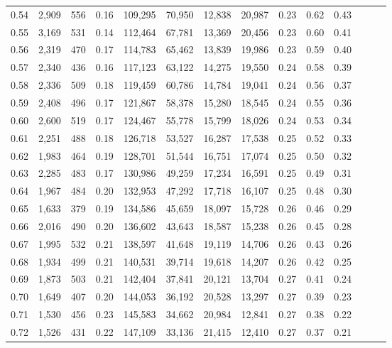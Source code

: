 \begin{tabular}{rrrrrrrrrrrrrr}
0.54 &  2,909 &    556 &  0.16 &  109,295 &   70,950 &  12,838 &  20,987 &  0.23 &  0.62 &      0.43 \\
0.55 &  3,169 &    531 &  0.14 &  112,464 &   67,781 &  13,369 &  20,456 &  0.23 &  0.60 &      0.41 \\
0.56 &  2,319 &    470 &  0.17 &  114,783 &   65,462 &  13,839 &  19,986 &  0.23 &  0.59 &      0.40 \\
0.57 &  2,340 &    436 &  0.16 &  117,123 &   63,122 &  14,275 &  19,550 &  0.24 &  0.58 &      0.39 \\
0.58 &  2,336 &    509 &  0.18 &  119,459 &   60,786 &  14,784 &  19,041 &  0.24 &  0.56 &      0.37 \\
0.59 &  2,408 &    496 &  0.17 &  121,867 &   58,378 &  15,280 &  18,545 &  0.24 &  0.55 &      0.36 \\
0.60 &  2,600 &    519 &  0.17 &  124,467 &   55,778 &  15,799 &  18,026 &  0.24 &  0.53 &      0.34 \\
0.61 &  2,251 &    488 &  0.18 &  126,718 &   53,527 &  16,287 &  17,538 &  0.25 &  0.52 &      0.33 \\
0.62 &  1,983 &    464 &  0.19 &  128,701 &   51,544 &  16,751 &  17,074 &  0.25 &  0.50 &      0.32 \\
0.63 &  2,285 &    483 &  0.17 &  130,986 &   49,259 &  17,234 &  16,591 &  0.25 &  0.49 &      0.31 \\
0.64 &  1,967 &    484 &  0.20 &  132,953 &   47,292 &  17,718 &  16,107 &  0.25 &  0.48 &      0.30 \\
0.65 &  1,633 &    379 &  0.19 &  134,586 &   45,659 &  18,097 &  15,728 &  0.26 &  0.46 &      0.29 \\
0.66 &  2,016 &    490 &  0.20 &  136,602 &   43,643 &  18,587 &  15,238 &  0.26 &  0.45 &      0.28 \\
0.67 &  1,995 &    532 &  0.21 &  138,597 &   41,648 &  19,119 &  14,706 &  0.26 &  0.43 &      0.26 \\
0.68 &  1,934 &    499 &  0.21 &  140,531 &   39,714 &  19,618 &  14,207 &  0.26 &  0.42 &      0.25 \\
0.69 &  1,873 &    503 &  0.21 &  142,404 &   37,841 &  20,121 &  13,704 &  0.27 &  0.41 &      0.24 \\
0.70 &  1,649 &    407 &  0.20 &  144,053 &   36,192 &  20,528 &  13,297 &  0.27 &  0.39 &      0.23 \\
0.71 &  1,530 &    456 &  0.23 &  145,583 &   34,662 &  20,984 &  12,841 &  0.27 &  0.38 &      0.22 \\
0.72 &  1,526 &    431 &  0.22 &  147,109 &   33,136 &  21,415 &  12,410 &  0.27 &  0.37 &      0.21 \\

\end{tabular}
